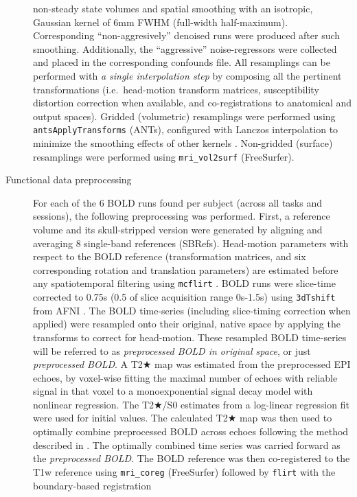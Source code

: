 \documentclass[
]{article}
\begin{document}
\begin{description}
non-steady state volumes and spatial smoothing with an isotropic,
Gaussian kernel of 6mm FWHM (full-width half-maximum). Corresponding
``non-aggresively'' denoised runs were produced after such smoothing.
Additionally, the ``aggressive'' noise-regressors were collected and
placed in the corresponding confounds file. All resamplings can be
performed with \emph{a single interpolation step} by composing all the
pertinent transformations (i.e.~head-motion transform matrices,
susceptibility distortion correction when available, and
co-registrations to anatomical and output spaces). Gridded (volumetric)
resamplings were performed using \texttt{antsApplyTransforms} (ANTs),
configured with Lanczos interpolation to minimize the smoothing effects
of other kernels \citep{lanczos}. Non-gridded (surface) resamplings were
performed using \texttt{mri\_vol2surf} (FreeSurfer).
\item[Functional data preprocessing]
For each of the 6 BOLD runs found per subject (across all tasks and
sessions), the following preprocessing was performed. First, a reference
volume and its skull-stripped version were generated by aligning and
averaging 8 single-band references (SBRefs). Head-motion parameters with
respect to the BOLD reference (transformation matrices, and six
corresponding rotation and translation parameters) are estimated before
any spatiotemporal filtering using \texttt{mcflirt} \citep[FSL
6.0.5.1:57b01774,][]{mcflirt}. BOLD runs were slice-time corrected to
0.75s (0.5 of slice acquisition range 0s-1.5s) using \texttt{3dTshift}
from AFNI \citep[RRID:SCR\_005927]{afni}. The BOLD time-series
(including slice-timing correction when applied) were resampled onto
their original, native space by applying the transforms to correct for
head-motion. These resampled BOLD time-series will be referred to as
\emph{preprocessed BOLD in original space}, or just \emph{preprocessed
BOLD}. A T2★ map was estimated from the preprocessed EPI echoes, by
voxel-wise fitting the maximal number of echoes with reliable signal in
that voxel to a monoexponential signal decay model with nonlinear
regression. The T2★/S0 estimates from a log-linear regression fit were
used for initial values. The calculated T2★ map was then used to
optimally combine preprocessed BOLD across echoes following the method
described in \citep{posse_t2s}. The optimally combined time series was
carried forward as the \emph{preprocessed BOLD}. The BOLD reference was
then co-registered to the T1w reference using \texttt{mri\_coreg}
(FreeSurfer) followed by \texttt{flirt} \citep[FSL
6.0.5.1:57b01774,][]{flirt} with the boundary-based registration

\end{description}
\end{document}
